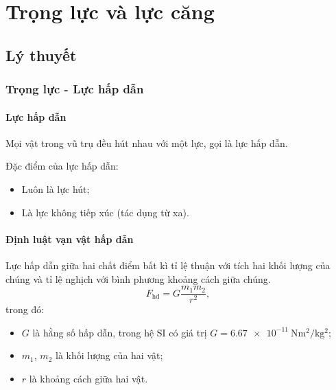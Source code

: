 \let\lesson\undefined
\newcommand{\lesson}{\phantomlesson{Bài 12: Một số lực trong thực tiễn}}
\chapter[Trọng lực và lực căng]{Trọng lực và lực căng}
\setcounter{section}{0}
\section{Lý thuyết}
\subsection{Trọng lực - Lực hấp dẫn}
\subsubsection{Lực hấp dẫn}
Mọi vật trong vũ trụ đều hút nhau với một lực, gọi là lực hấp dẫn.

Đặc điểm của lực hấp dẫn:	
\begin{itemize}
	\item Luôn là lực hút;
	\item Là lực không tiếp xúc (tác dụng từ xa).
\end{itemize}

\subsubsection{Định luật vạn vật hấp dẫn} 
\begin{center}
\end{center}
Lực hấp dẫn giữa hai chất điểm bất kì tỉ lệ thuận với tích hai khối lượng của chúng và tỉ lệ nghịch với bình phương khoảng cách giữa chúng.
\begin{equation*}
	F_{\text {hd}} = G \dfrac {m_1 m_2 }{r^2},
\end{equation*}
trong đó:
\begin{itemize}
	\item $G$ là hằng số hấp dẫn, trong hệ SI có giá trị $G=\SI{6.67e-11}{\newton \meter ^2/\kilogram ^2}$;
	\item $m_1$, $m_2$ là khối lượng của hai vật;
	\item $r$ là khoảng cách giữa hai vật.
\end{itemize}

